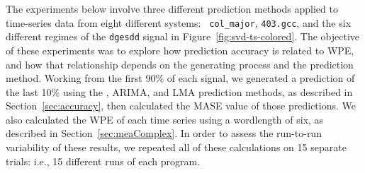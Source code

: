 







The experiments below involve three different prediction methods
applied to time-series data from eight different systems: {\tt
  col\_major}, {\tt 403.gcc}, and the six different regimes of the
{\tt dgesdd} signal in Figure~\ref{fig:svd-ts-colored}.  The objective of these
experiments was to explore how prediction accuracy is related to WPE,
and how that relationship depends on the generating process and the
prediction method.  Working from the first 90\% of each signal, we
generated a prediction of the last 10\% using the \naive, ARIMA, and
LMA prediction methods, as described in Section~\ref{sec:accuracy},
then calculated the MASE value of those predictions.  We also
calculated the WPE of each time series using a wordlength of six, as
described in Section~\ref{sec:meaComplex}.  In order to assess the
run-to-run variability of these results, we repeated all of these
calculations on 15 separate trials: i.e., 15 different runs of each
program.

